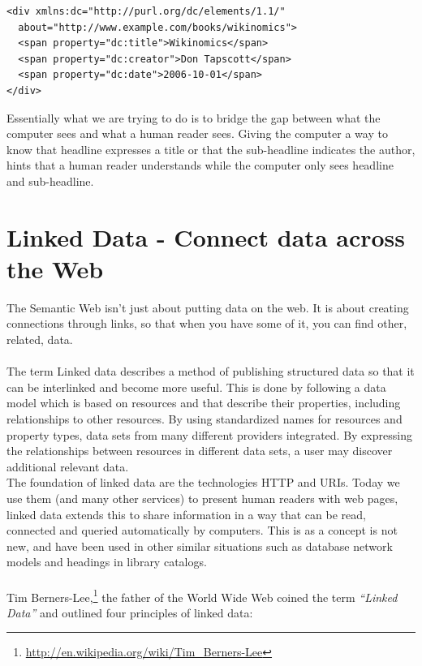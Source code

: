 \begin{verbatim}
<div xmlns:dc="http://purl.org/dc/elements/1.1/"
  about="http://www.example.com/books/wikinomics">
  <span property="dc:title">Wikinomics</span>
  <span property="dc:creator">Don Tapscott</span>
  <span property="dc:date">2006-10-01</span>
</div>
\end{verbatim}
\linebreak
\newline
Essentially what we are trying to do is to bridge the gap between what the computer sees and what a human reader sees. Giving the computer a way to know that headline expresses a title or that the sub-headline indicates the author, hints that a human reader understands while the computer only sees headline and sub-headline. 

\section{Linked Data - Connect data across the Web}
The Semantic Web isn't just about putting data on the web. It is about creating connections through links, so that when you have some of it, you can find other, related, data.\\\\
The term Linked data describes a method of publishing structured data so that it can be interlinked and become more useful.\cite{semanticIntroBib}\cite{linkEssBib} This is done by following a data model which is based on resources and that describe their properties, including relationships to other resources. By using standardized names for resources and property types, data sets from many different providers integrated. By expressing the relationships between resources in different data sets, a user may discover additional relevant data.\\
The foundation of linked data are the technologies HTTP and URIs. Today we use them (and many other services) to present human readers with web pages, linked data extends this to share information in a way that can be read, connected and queried automatically by computers. This is as a concept is not new, and have been used in other similar situations such as database network models and headings in library catalogs.\cite{LinkedTimBib}\\\\
Tim Berners-Lee,\footnote{\url{http://en.wikipedia.org/wiki/Tim_Berners-Lee}} the father of the World Wide Web coined the term \textit{“Linked Data”} and outlined four principles of linked data:\cite{LinkedTimBib2}
